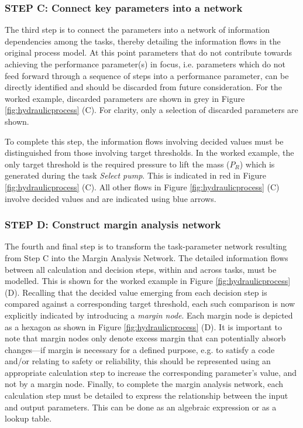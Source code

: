 \subsubsection{STEP C: Connect key parameters into a network}
The third step is to connect the parameters into a network of information dependencies among the tasks, thereby detailing the information flows in the original process model. At this point parameters that do not contribute towards achieving the performance parameter(s) in focus, i.e. parameters which do not feed forward through a sequence of steps into a performance parameter, can be directly identified and should be discarded from future consideration. For the worked example, discarded parameters are shown in grey in Figure \ref{fig:hydraulicprocess} (C). For clarity, only a selection of discarded parameters are shown.

To complete this step, the information flows involving decided values must be distinguished from those involving target thresholds. In the worked example, the only target threshold is the required pressure to lift the mass ($P_R$) which is generated during the task \emph{Select pump}. This is indicated in red in Figure \ref{fig:hydraulicprocess} (C). All other flows in  Figure \ref{fig:hydraulicprocess} (C) involve decided values and are indicated using blue arrows.\\


\subsubsection{STEP D: Construct margin analysis network}\label{networkdiagram}

The fourth and final step is to transform the task-parameter network resulting from Step C into the Margin Analysis Network. The detailed information flows between all calculation and decision steps, within and across tasks, must be modelled. This is shown for the worked example in Figure \ref{fig:hydraulicprocess} (D). Recalling that the decided value emerging from each decision step is compared against a corresponding target threshold, each such comparison is now explicitly indicated by introducing a \emph{margin node}. Each margin node is depicted as a hexagon as shown in Figure \ref{fig:hydraulicprocess} (D). It is important to note that margin nodes only denote excess margin that can potentially absorb changes---if margin is necessary for a defined purpose, e.g. to satisfy a code and/or relating to safety or reliability, this should be represented using an appropriate calculation step to increase the corresponding parameter's value, and not by a margin node. Finally, to complete the margin analysis network, each calculation step must be detailed to express the relationship between the input and output parameters. This can be done as an algebraic expression or as a lookup table.

